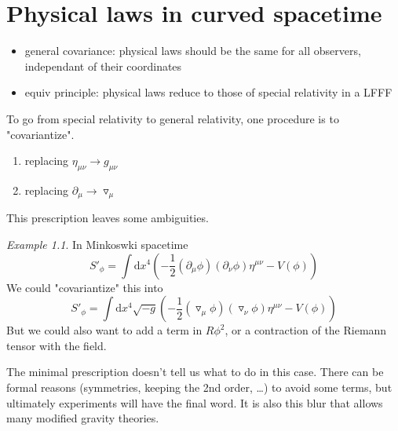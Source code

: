 \documentclass[a4paper]{book}
\theoremstyle{definition}
\theoremstyle{remark}
\newtheorem*{example}{Example}
\begin{document}
\chapter{Physical laws in curved spacetime}

\begin{itemize}
    \item general covariance: physical laws should be the same for all observers, independant of their coordinates
    \item equiv principle: physical laws reduce to those of special relativity in a LFFF 
\end{itemize}

To go from special relativity to general relativity, one procedure is to "covariantize". 
\begin{enumerate}
    \item replacing $\eta_{\mu\nu} \rightarrow g_{\mu\nu}$
    \item replacing $\partial_\mu \rightarrow \triangledown_\mu$
\end{enumerate}

This prescription leaves some ambiguities. 
\begin{example}
    In Minkoswki spacetime 
    \begin{equation}
        S'_\phi = \int \text{d}x^4 \left( -\frac{1}{2}(\partial_\mu \phi)(\partial_\nu \phi) \eta^{\mu\nu} - V(\phi)\right)
    \end{equation}
    We could "covariantize" this into 
    \begin{equation}
        S'_\phi = \int \text{d}x^4 \sqrt{-g}\left( -\frac{1}{2}(\triangledown_\mu \phi)(\triangledown_\nu \phi) \eta^{\mu\nu} - V(\phi)\right)
    \end{equation}
    But we could also want to add a term in $R\phi^2$, or a contraction of the Riemann tensor with the field. 
\end{example}
The minimal prescription doesn't tell us what to do in this case. There can be formal reasons (symmetries, keeping the 2nd order, \dots) to avoid some terms, but ultimately experiments will have the final word. It is also this blur that allows many modified gravity theories. \par \medskip 
\end{document}
